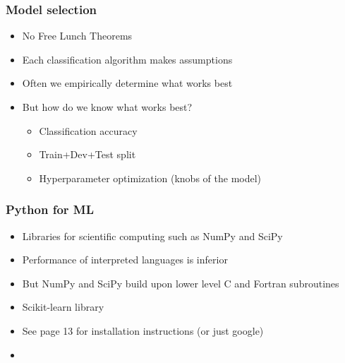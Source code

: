 \documentclass{beamer}
\begin{document}
\begin{frame}
  \frametitle{Model selection}
  \begin{itemize}
  \item No Free Lunch Theorems
  \item Each classification algorithm makes assumptions
  \item Often we empirically determine what works best
  \item But how do we know what works best?
    \begin{itemize}
    \item Classification accuracy
    \item Train+Dev+Test split
    \item Hyperparameter optimization (knobs of the model)
    \end{itemize}
  \end{itemize}
\end{frame}

\begin{frame}
  \frametitle{Python for ML}
  \begin{itemize}
  \item Libraries for scientific computing such as NumPy and SciPy
  \item Performance of interpreted languages is inferior
  \item But NumPy and SciPy build upon lower level C and Fortran subroutines
  \item Scikit-learn library
  \item See page 13 for installation instructions (or just google)
  \item \href{http://jalammar.github.io/visual-numpy/}{}    
  \end{itemize}
\end{frame}
\end{document}
